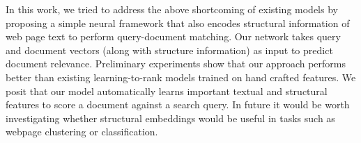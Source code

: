 \documentclass[runningheads,a4paper]{llncs}
\begin{document}
In this work, we tried to address the above shortcoming of existing models by proposing a simple 
neural framework that also encodes structural information of web page text to perform query-document matching. 
Our network takes query and document vectors (along with structure information) as input to predict document 
relevance. Preliminary experiments show that our approach performs better than existing learning-to-rank models 
trained on hand crafted features. We posit that our model automatically learns important textual 
and structural features to score a document against a search query. In future it would be worth 
investigating whether structural embeddings would be useful in tasks such 
as webpage clustering 
or classification.






\scriptsize
{

}
\end{document}
